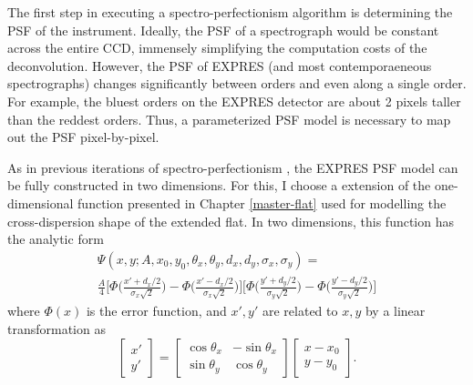The first step in executing a spectro-perfectionism algorithm is determining the PSF of the instrument. Ideally, the PSF of a spectrograph would be constant across the entire CCD, immensely simplifying the computation costs of the deconvolution. However, the PSF of EXPRES (and most contemporaeneous spectrographs) changes significantly between orders and even along a single order. For example, the bluest orders on the EXPRES detector are about 2 pixels taller than the reddest orders. Thus, a parameterized PSF model is necessary to map out the PSF pixel-by-pixel.

As in previous iterations of spectro-perfectionism \citep{bolton_spectro-perfectionism_2009, cornachione_full_2019}, the EXPRES PSF model can be fully constructed in two dimensions. For this, I choose a extension of the one-dimensional function presented in Chapter \ref{master-flat} used for modelling the cross-dispersion shape of the extended flat. In two dimensions, this function has the analytic form
\begin{multline}
    \Psi(x, y; A, x_0, y_0, \theta_x, \theta_y, d_x, d_y, \sigma_x, \sigma_y) = \\
    \frac{A}{4} \Bigg[\Phi\bigg(\frac{x' + d_x/2}{\sigma_x \sqrt{2}}\bigg) - \Phi\bigg(\frac{x' - d_x/2}{\sigma_x \sqrt{2}}\bigg)\Bigg] \Bigg[\Phi\bigg(\frac{y' + d_y/2}{\sigma_y \sqrt{2}}\bigg) - \Phi\bigg(\frac{y' - d_y/2}{\sigma_y \sqrt{2}}\bigg)\Bigg]
    \label{eq:expres_psf}
\end{multline}
where $\Phi(x)$ is the error function, and $x',y'$ are related to $x,y$ by a linear transformation as
\begin{equation}
    \begin{bmatrix}x' \\ y' \end{bmatrix} = 
    \begin{bmatrix}\cos \theta_x & -\sin\theta_x \\ \sin \theta_y & \cos\theta_y\end{bmatrix}\begin{bmatrix}x-x_0 \\ y-y_0\end{bmatrix}.
    \label{eq:pix-transformation}
\end{equation}

